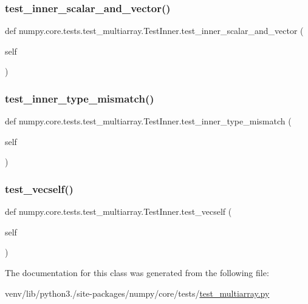 \subsubsection{\texorpdfstring{test\+\_\+inner\+\_\+scalar\+\_\+and\+\_\+vector()}{test\_inner\_scalar\_and\_vector()}}
{\footnotesize\ttfamily def numpy.\+core.\+tests.\+test\+\_\+multiarray.\+Test\+Inner.\+test\+\_\+inner\+\_\+scalar\+\_\+and\+\_\+vector (\begin{DoxyParamCaption}\item[{}]{self }\end{DoxyParamCaption})}

\mbox{\label{classnumpy_1_1core_1_1tests_1_1test__multiarray_1_1TestInner_a1974dce13bb804b80d48a32e6595bc23}} 
\subsubsection{\texorpdfstring{test\+\_\+inner\+\_\+type\+\_\+mismatch()}{test\_inner\_type\_mismatch()}}
{\footnotesize\ttfamily def numpy.\+core.\+tests.\+test\+\_\+multiarray.\+Test\+Inner.\+test\+\_\+inner\+\_\+type\+\_\+mismatch (\begin{DoxyParamCaption}\item[{}]{self }\end{DoxyParamCaption})}

\mbox{\label{classnumpy_1_1core_1_1tests_1_1test__multiarray_1_1TestInner_aa2ee067b419d429624c48dd3c2af0e48}} 
\subsubsection{\texorpdfstring{test\+\_\+vecself()}{test\_vecself()}}
{\footnotesize\ttfamily def numpy.\+core.\+tests.\+test\+\_\+multiarray.\+Test\+Inner.\+test\+\_\+vecself (\begin{DoxyParamCaption}\item[{}]{self }\end{DoxyParamCaption})}



The documentation for this class was generated from the following file\+:\begin{DoxyCompactItemize}
\item 
venv/lib/python3./site-\/packages/numpy/core/tests/\hyperlink{core_2tests_2test__multiarray_8py}{test\+\_\+multiarray.\+py}\end{DoxyCompactItemize}
